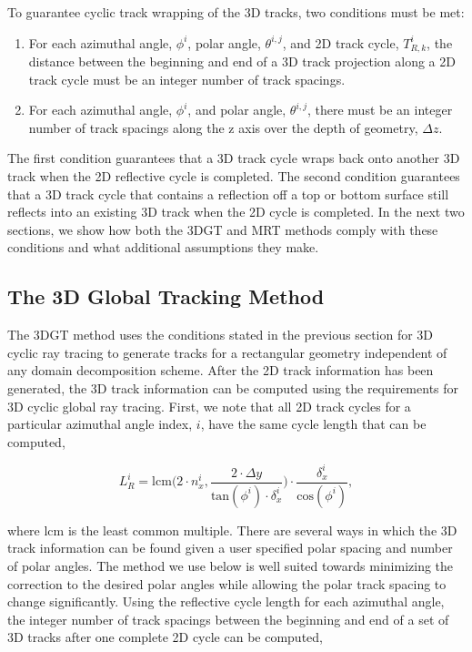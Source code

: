 \noindent
To guarantee cyclic track wrapping of the 3D tracks, two conditions must be met:

\begin{enumerate}
	\item For each azimuthal angle, $\phi^i$, polar angle, $\theta^{i,j}$, and 2D track cycle, $T_{R,k}^{i}$, the distance between the beginning and end of a 3D track projection along a 2D track cycle must be an integer number of track spacings.
	\item For each azimuthal angle, $\phi^i$, and polar angle, $\theta^{i,j}$, there must be an integer number of track spacings along the z axis over the depth of geometry, $\Delta z$.
\end{enumerate}

The first condition guarantees that a 3D track cycle wraps back onto another 3D track when the 2D reflective cycle is completed. The second condition guarantees that a 3D track cycle that contains a reflection off a top or bottom surface still reflects into an existing 3D track when the 2D cycle is completed. In the next two sections, we show how both the 3DGT and MRT methods comply with these conditions and what additional assumptions they make.

\subsection{The 3D Global Tracking Method}

The 3DGT method uses the conditions stated in the previous section for 3D cyclic ray tracing to generate tracks for a rectangular geometry independent of any domain decomposition scheme. After the 2D track information has been generated, the 3D track information can be computed using the requirements for 3D cyclic global ray tracing. First, we note that all 2D track cycles for a particular azimuthal angle index, $i$, have the same cycle length that can be computed,

\begin{equation}
L_R^i = \text{lcm}\bigg( 2 \cdot n_x^i,  \frac{2 \cdot \Delta y}{\text{tan} (\phi^i) \cdot \delta_x^i} \bigg) \cdot \frac{\delta_x^i}{\text{cos} (\phi^i)},
\label{eqn:refl-cycle-len}
\end{equation}

\noindent
where lcm is the least common multiple. There are several ways in which the 3D track information can be found given a user specified polar spacing and number of polar angles. The method we use below is well suited towards minimizing the correction to the desired polar angles while allowing the polar track spacing to change significantly. Using the reflective cycle length for each azimuthal angle, the integer number of track spacings between the beginning and end of a set of 3D tracks after one complete 2D cycle can be computed,

